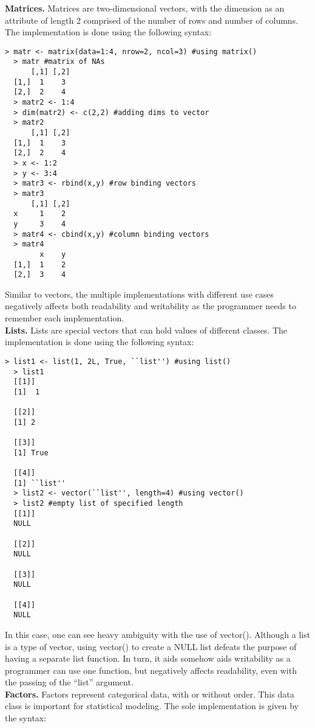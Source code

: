 \documentclass[12pt]{article}
\begin{document}
\textbf{Matrices.} Matrices are two-dimensional vectors, with the dimension as an attribute of length 2 comprised of the number of rows and number of columns. The implementation is done using the following syntax:

\begin{lstlisting}[frame=single]
  > matr <- matrix(data=1:4, nrow=2, ncol=3) #using matrix()
  > matr #matrix of NAs
      [,1] [,2]
  [1,]  1    3
  [2,]  2    4
  > matr2 <- 1:4
  > dim(matr2) <- c(2,2) #adding dims to vector
  > matr2
      [,1] [,2]
  [1,]  1    3
  [2,]  2    4
  > x <- 1:2
  > y <- 3:4
  > matr3 <- rbind(x,y) #row binding vectors
  > matr3
      [,1] [,2]
  x     1    2
  y     3    4
  > matr4 <- cbind(x,y) #column binding vectors
  > matr4
        x    y
  [1,]  1    2
  [2,]  3    4
\end{lstlisting}

Similar to vectors, the multiple implementations with different use cases negatively affects both readability and writability as the programmer needs to remember each implementation.\\

\textbf{Lists.} Lists are special vectors that can hold values of different classes. The implementation is done using the following syntax:

\begin{lstlisting}[frame=single]
  > list1 <- list(1, 2L, True, ``list'') #using list()
  > list1
  [[1]]
  [1]  1

  [[2]]
  [1] 2

  [[3]]
  [1] True

  [[4]]
  [1] ``list''
  > list2 <- vector(``list'', length=4) #using vector()
  > list2 #empty list of specified length
  [[1]]
  NULL

  [[2]]
  NULL

  [[3]]
  NULL

  [[4]]
  NULL
\end{lstlisting}

In this case, one can see heavy ambiguity with the use of vector(). Although a list is a type of vector, using vector() to create a NULL list defeats the purpose of having a separate list function. In turn, it aids somehow aids writability as a programmer can use one function, but negatively affects readability, even with the passing of the ``list'' argument.\\

\textbf{Factors.} Factors represent categorical data, with or without order. This data class is important for statistical modeling. The sole implementation is given by the syntax:
\end{document}
